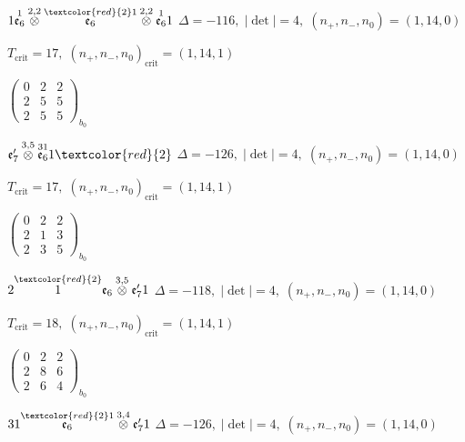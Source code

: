 \documentclass[10pt]{article}
\begin{document}
$1\overset{1}{\mathfrak{e}_6}\overset{2,2}{\otimes}\overset{\textcolor{red}{2}1}{\mathfrak{e}_6}\overset{2,2}{\otimes}\overset{1}{\mathfrak{e}_6}1$ \quad $\Delta=-116,\; |\det|=4,\; (n_+,n_-,n_0)=(1,14,0)$

\hspace{1em}$T_{\text{crit}}=17,\; (n_+,n_-,n_0)_{\text{crit}}=(1,14,1)$

\hspace{2em}$\left(\begin{smallmatrix}0 & 2 & 2 \\ 2 & 5 & 5 \\ 2 & 5 & 5\end{smallmatrix}\right)_{\!b_0}$

\smallskip

$\mathfrak{e}_7'\overset{3,5}{\otimes}\overset{31}{\mathfrak{e}_6}1\textcolor{red}{2}$ \quad $\Delta=-126,\; |\det|=4,\; (n_+,n_-,n_0)=(1,14,0)$

\hspace{1em}$T_{\text{crit}}=17,\; (n_+,n_-,n_0)_{\text{crit}}=(1,14,1)$

\hspace{2em}$\left(\begin{smallmatrix}0 & 2 & 2 \\ 2 & 1 & 3 \\ 2 & 3 & 5\end{smallmatrix}\right)_{\!b_0}$

\smallskip

$2\overset{\textcolor{red}{2}}{1}\mathfrak{e}_6\overset{3,5}{\otimes}\mathfrak{e}_7'1$ \quad $\Delta=-118,\; |\det|=4,\; (n_+,n_-,n_0)=(1,14,0)$

\hspace{1em}$T_{\text{crit}}=18,\; (n_+,n_-,n_0)_{\text{crit}}=(1,14,1)$

\hspace{2em}$\left(\begin{smallmatrix}0 & 2 & 2 \\ 2 & 8 & 6 \\ 2 & 6 & 4\end{smallmatrix}\right)_{\!b_0}$

\smallskip

$31\overset{\textcolor{red}{2}1}{\mathfrak{e}_6}\overset{3,4}{\otimes}\mathfrak{e}_7'1$ \quad $\Delta=-126,\; |\det|=4,\; (n_+,n_-,n_0)=(1,14,0)$
\end{document}
